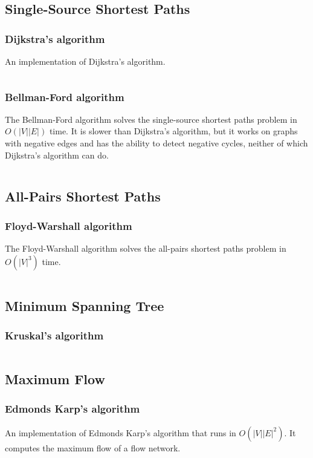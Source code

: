 \documentclass[9pt,a4paper,twocolumn,landscape,oneside]{amsart}
\newcommand{\code}[1]{\inputminted{cpp}{_Code/#1}}
\begin{document}
    \subsection{Single-Source Shortest Paths}
        \subsubsection{Dijkstra's algorithm}
            An implementation of Dijkstra's algorithm.
            \code{Graphs/dijkstra.cpp}

      \subsubsection{Bellman-Ford algorithm}
            The Bellman-Ford algorithm solves the single-source shortest paths
            problem in $O(|V||E|)$ time. It is slower than Dijkstra's
            algorithm, but it works on graphs with negative edges and has the
            ability to detect negative cycles, neither of which Dijkstra's
            algorithm can do.
            \code{Graphs/bellman_ford.cpp}

    \subsection{All-Pairs Shortest Paths}
        \subsubsection{Floyd-Warshall algorithm}
            The Floyd-Warshall algorithm solves the all-pairs shortest paths
            problem in $O(|V|^3)$ time.
            \code{Graphs/floyd_warshall.cpp}

    \subsection{Minimum Spanning Tree}
        \subsubsection{Kruskal's algorithm}
            \code{Graphs/kruskal_prim.cpp}

    \subsection{Maximum Flow}
        \subsubsection{Edmonds Karp's algorithm}
            An implementation of Edmonds Karp's algorithm that runs in
            $O(|V||E|^2)$. It computes the maximum flow of a flow network.
            \code{Graphs/edmond_karp.cpp}
\end{document}
